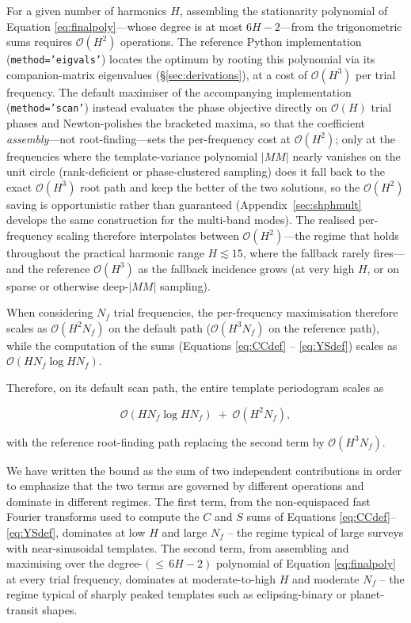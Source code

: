 \documentclass[apj]{emulateapj}
\newcommand{\bigO}{\mathcal{O}}
\begin{document}
For a given number of harmonics $H$, assembling the stationarity
polynomial of Equation \ref{eq:finalpoly}---whose degree is at most
$6H-2$---from the trigonometric sums requires $\bigO(H^2)$ operations.
The reference Python implementation (\texttt{method='eigvals'}) locates the
optimum by rooting this polynomial via its companion-matrix eigenvalues
(\S\ref{sec:derivations}), at a cost of $\bigO(H^3)$ per trial frequency.
The default maximiser of the accompanying implementation
(\texttt{method='scan'}) instead evaluates the phase objective directly on
$\bigO(H)$ trial phases and Newton-polishes the bracketed maxima, so that the
coefficient \emph{assembly}---not root-finding---sets the per-frequency cost at
$\bigO(H^2)$; only at the frequencies where the template-variance polynomial
$|MM|$ nearly vanishes on the unit circle (rank-deficient or phase-clustered
sampling) does it fall back to the exact $\bigO(H^3)$ root path and keep the
better of the two solutions, so the $\bigO(H^2)$ saving is opportunistic rather
than guaranteed (Appendix~\ref{sec:shphmult} develops the same construction for
the multi-band modes). The realised per-frequency scaling therefore interpolates
between $\bigO(H^2)$---the regime that holds throughout the practical harmonic
range $H\lesssim 15$, where the fallback rarely fires---and the reference
$\bigO(H^3)$ as the fallback incidence grows (at very high $H$, or on sparse or
otherwise deep-$|MM|$ sampling).

When considering $N_f$ trial frequencies, the per-frequency maximisation
therefore scales as $\bigO(H^2N_f)$ on the default path
($\bigO(H^3N_f)$ on the reference path), while the computation of the sums
(Equations \ref{eq:CCdef} -- \ref{eq:YSdef}) scales as $\bigO(HN_f\log HN_f)$.


Therefore, on its default scan path, the entire template periodogram scales as

\begin{equation}\label{eq:bigO}
\bigO(HN_f \log HN_f) \;+\; \bigO(H^2N_f),
\end{equation}

with the reference root-finding path replacing the second term by $\bigO(H^3N_f)$.

We have written the bound as the sum of two independent
contributions in order to emphasize that the two terms are
governed by different operations and dominate in different
regimes.  The first term, from the non-equispaced fast Fourier
transforms used to compute the $C$ and $S$ sums of
Equations \ref{eq:CCdef}--\ref{eq:YSdef}, dominates at low
$H$ and large $N_f$ -- the regime typical of large surveys with
near-sinusoidal templates.  The second term, from assembling and
maximising over the degree-$({\le}\,6H{-}2)$ polynomial of
Equation \ref{eq:finalpoly} at every trial frequency, dominates
at moderate-to-high $H$ and moderate $N_f$ -- the regime typical
of sharply peaked templates such as eclipsing-binary or
planet-transit shapes.
\end{document}

